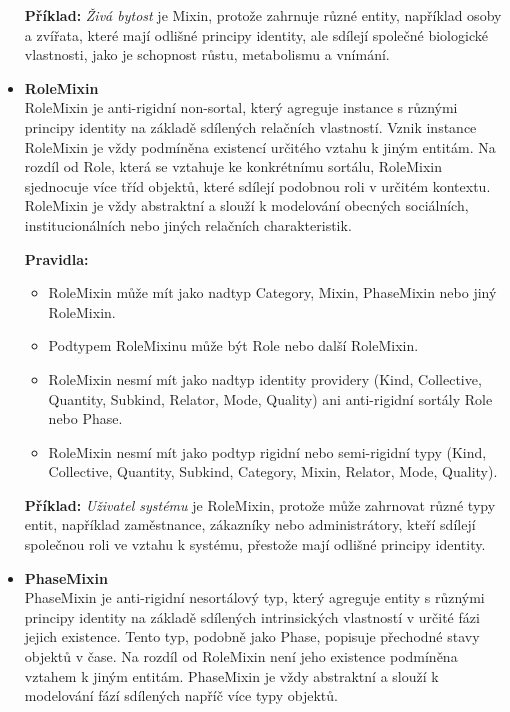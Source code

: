 \begin{itemize}
  \textbf{Příklad:} \textit{Živá bytost} je Mixin, protože zahrnuje různé entity, například osoby a zvířata, které mají odlišné principy identity, ale sdílejí společné biologické vlastnosti, jako je schopnost růstu, metabolismu a vnímání.


  \item \textbf{RoleMixin} \\
  RoleMixin je anti-rigidní non-sortal, který agreguje instance s různými principy identity na základě sdílených relačních vlastností. Vznik instance RoleMixin je vždy podmíněna existencí určitého vztahu k jiným entitám. Na rozdíl od Role, která se vztahuje ke konkrétnímu sortálu, RoleMixin sjednocuje více tříd objektů, které sdílejí podobnou roli v určitém kontextu. RoleMixin je vždy abstraktní a slouží k modelování obecných sociálních, institucionálních nebo jiných relačních charakteristik. \cite{KOM_prezentace3,ontouml_class_stereotypes}

  \textbf{Pravidla:}
  \begin{itemize}
    \item RoleMixin může mít jako nadtyp Category, Mixin, PhaseMixin nebo jiný RoleMixin.
    \item Podtypem RoleMixinu může být Role nebo další RoleMixin.
    \item RoleMixin nesmí mít jako nadtyp identity providery (Kind, Collective, Quantity, Subkind, Relator, Mode, Quality) ani anti-rigidní sortály Role nebo Phase.
    \item RoleMixin nesmí mít jako podtyp rigidní nebo semi-rigidní typy (Kind, Collective, Quantity, Subkind, Category, Mixin, Relator, Mode, Quality). \cite{ontouml_class_stereotypes}
  \end{itemize}

  \textbf{Příklad:} \textit{Uživatel systému} je RoleMixin, protože může zahrnovat různé typy entit, například zaměstnance, zákazníky nebo administrátory, kteří sdílejí společnou roli ve vztahu k systému, přestože mají odlišné principy identity.


  \item \textbf{PhaseMixin} \\
  PhaseMixin je anti-rigidní nesortálový typ, který agreguje entity s různými principy identity na základě sdílených intrinsických vlastností v určité fázi jejich existence. Tento typ, podobně jako Phase, popisuje přechodné stavy objektů v čase. Na rozdíl od RoleMixin není jeho existence podmíněna vztahem k jiným entitám. PhaseMixin je vždy abstraktní a slouží k modelování fází sdílených napříč více typy objektů. \cite{KOM_prezentace3,ontouml_class_stereotypes}


\end{itemize}
